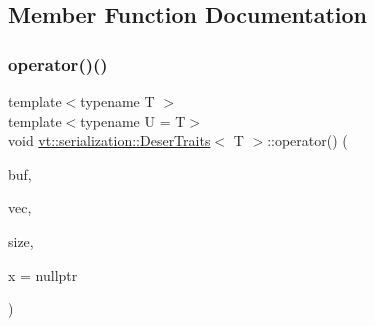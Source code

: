 \subsection{Member Function Documentation}
\mbox{\label{structvt_1_1serialization_1_1_deser_traits_a26d43fcff6357964eed8a8f0172f28b8}} 
\subsubsection{\texorpdfstring{operator()()}{operator()()}\hspace{0.1cm}{\footnotesize\ttfamily [1/2]}}
{\footnotesize\ttfamily template$<$typename T $>$ \\
template$<$typename U  = T$>$ \\
void \hyperlink{structvt_1_1serialization_1_1_deser_traits}{vt\+::serialization\+::\+Deser\+Traits}$<$ T $>$\+::operator() (\begin{DoxyParamCaption}\item[{\hyperlink{namespacevt_1_1serialization_a74f8d1a55940f9c38fc29522de66d926}{Serial\+Byte\+Type} $\ast$}]{buf,  }\item[{T \&}]{vec,  }\item[{Size\+Type}]{size,  }\item[{\hyperlink{structvt_1_1serialization_1_1_deser_traits_a597577985e3b199e73cf052e445c9a5e}{is\+Vec\+Type}$<$ U $>$ $\ast$}]{x = {\ttfamily nullptr} }\end{DoxyParamCaption})\hspace{0.3cm}{\ttfamily [inline]}}

\mbox{\label{structvt_1_1serialization_1_1_deser_traits_a2562604ed89ca8421bed0266bd581c79}} 
